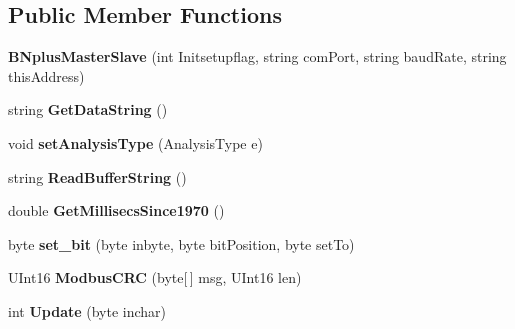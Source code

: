 \subsection*{Public Member Functions}
\begin{DoxyCompactItemize}
\item 
\mbox{\label{class_b_n_a30_1_1_b_nplus_master_slave_af278230aef246c4304a62dba36813c7d}} 
{\bfseries B\+Nplus\+Master\+Slave} (int Initsetupflag, string com\+Port, string baud\+Rate, string this\+Address)
\item 
\mbox{\label{class_b_n_a30_1_1_b_nplus_master_slave_a9945871578c59d1379d80ae73dabfec9}} 
string {\bfseries Get\+Data\+String} ()
\item 
\mbox{\label{class_b_n_a30_1_1_b_nplus_master_slave_a550b2bebbab60601f049c9d209f8b5e9}} 
void {\bfseries set\+Analysis\+Type} (Analysis\+Type e)
\item 
\mbox{\label{class_b_n_a30_1_1_b_nplus_master_slave_a3d1501e0638b3c805f9d48fd685c2e80}} 
string {\bfseries Read\+Buffer\+String} ()
\item 
\mbox{\label{class_b_n_a30_1_1_b_nplus_master_slave_add46e7dfa7c7e1c18454edbbed060b9e}} 
double {\bfseries Get\+Millisecs\+Since1970} ()
\item 
\mbox{\label{class_b_n_a30_1_1_b_nplus_master_slave_ac759bb009a2e318bae5850cc188b06a9}} 
byte {\bfseries set\+\_\+bit} (byte inbyte, byte bit\+Position, byte set\+To)
\item 
\mbox{\label{class_b_n_a30_1_1_b_nplus_master_slave_af744d2c0a6d634d227990ae37cfd9a0a}} 
U\+Int16 {\bfseries Modbus\+C\+RC} (byte\mbox{[}$\,$\mbox{]} msg, U\+Int16 len)
\item 
\mbox{\label{class_b_n_a30_1_1_b_nplus_master_slave_a1ee63e6740f6b46a54ea02a953b5f6b1}} 
int {\bfseries Update} (byte inchar)
\item 
\mbox{\label{class_b_n_a30_1_1_b_nplus_master_slave_a1ad0efc92f00cadc24ea6e1e709d2673}} 

\end{DoxyCompactItemize}

